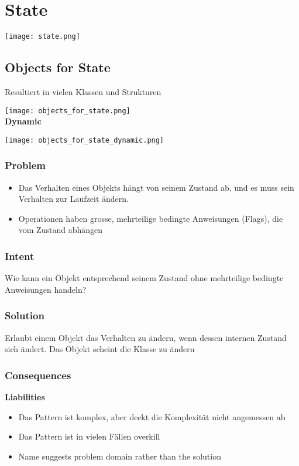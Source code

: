 \section{State}

\texttt{[image: state.png]}

\subsection{Objects for State}

Resultiert in vielen Klassen und Strukturen

\texttt{[image: objects\_for\_state.png]} \\

\textbf{Dynamic}

\texttt{[image: objects\_for\_state\_dynamic.png]}

\subsubsection{Problem}
\begin{itemize}
    \item Das Verhalten eines Objekts hängt von seinem Zustand ab, und es muss sein Verhalten zur Laufzeit ändern.
    \item Operationen haben grosse, mehrteilige bedingte Anweisungen (Flags), die vom Zustand abhängen
\end{itemize}
\subsubsection{Intent}
Wie kann ein Objekt entsprechend seinem Zustand ohne mehrteilige bedingte Anweisungen handeln?

\subsubsection{Solution}

Erlaubt einem Objekt das Verhalten zu ändern, wenn dessen internen Zustand sich ändert. Das Objekt scheint die Klasse zu ändern

\subsubsection{Consequences}
\textbf{Liabilities}
\begin{itemize}
    \item Das Pattern ist komplex, aber deckt die Komplexität nicht angemessen ab
    \item Das Pattern ist in vielen Fällen overkill
    \item Name suggests problem domain rather than the solution
\end{itemize}


